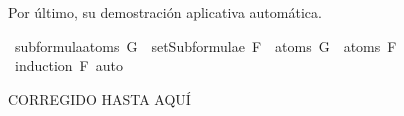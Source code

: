 \begin{isabellebody}
\isamarkupfalse%
%
\endisatagproof
{\isafoldproof}%
%
\isadelimproof
%
\endisadelimproof
%
\begin{isamarkuptext}%
Por último, su demostración aplicativa automática.%
\end{isamarkuptext}\isamarkuptrue%
\isamarkupfalse%
\ subformula{\isacharunderscore}atoms{\isacharcolon}\ {\isachardoublequoteopen}G\ {\isasymin}\ setSubformulae\ F\ {\isasymLongrightarrow}\ atoms\ G\ {\isasymsubseteq}\ atoms\ F{\isachardoublequoteclose}\isanewline
%
\isadelimproof
\ \ %
\endisadelimproof
%
\isatagproof
{}\isamarkupfalse%
\ {\isacharparenleft}induction\ F{\isacharparenright}\ auto%
\endisatagproof
{\isafoldproof}%
%
\isadelimproof
%
\endisadelimproof
%
\begin{isamarkuptext}%
CORREGIDO HASTA AQUÍ%
\end{isamarkuptext}\isamarkuptrue%
%
\isadelimtheory
%
\endisadelimtheory
%
\isatagtheory
%
\endisatagtheory
{\isafoldtheory}%
%
\isadelimtheory
%
\endisadelimtheory
%
\end{isabellebody}%
\endinput
